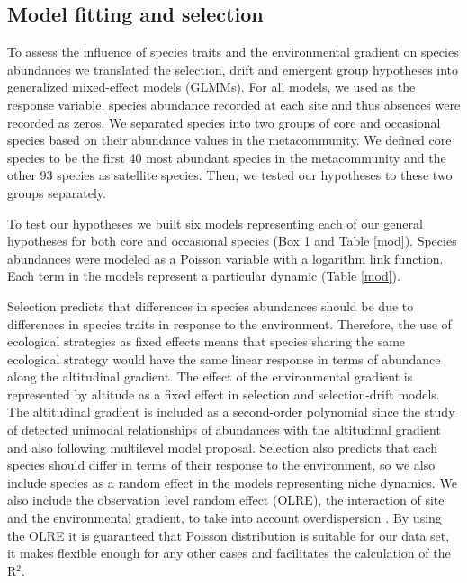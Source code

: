 \documentclass[12pt]{article}
\begin{document}
\subsection*{Model fitting and selection}

To assess the influence of species traits and the environmental gradient on species abundances we translated the selection, drift and emergent group hypotheses into generalized mixed-effect models (GLMMs). 
For all models, we used as the response variable, species abundance recorded at each site and thus absences were recorded as zeros. We separated species into two groups of core and occasional species based on their abundance values in the metacommunity. We defined core species to be the first 40 most abundant species in the metacommunity and the other 93 species as satellite species. Then, we tested our hypotheses to these two groups separately. 

To test our hypotheses we built six models representing each of our general hypotheses for both core and occasional species (Box 1 and Table \ref{mod}). Species abundances were modeled as a Poisson variable with a logarithm link function. 
Each term in the models represent a particular dynamic (Table \ref{mod}).  

Selection predicts that differences in species abundances should be due to differences in species traits in response to the environment. Therefore, the use of ecological strategies as fixed effects means that species sharing the same ecological strategy would have the same linear response in terms of abundance along the altitudinal gradient. The effect of the environmental gradient is represented by altitude as a fixed effect in selection and selection-drift models. The altitudinal gradient is included as a second-order polynomial since the study of \cite{Paciencia2008} detected 
unimodal relationships of abundances with the altitudinal gradient and also following \cite{Jamil2013a, Jamil2013} multilevel model proposal. Selection also predicts that each species should differ in terms of their response to the environment, so we also include species as a random effect in the models representing niche dynamics. We also include the observation level random effect (OLRE), the interaction of site and the environmental gradient, to take into account overdispersion \citep{Bolker2009}. By using the OLRE it is guaranteed that Poisson distribution is suitable for our data set, it makes flexible enough for any other cases and facilitates the calculation of the R{$^2$}.   
\end{document}
